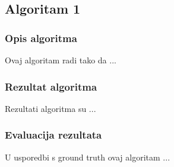 \subsection{Algoritam 1}

\subsubsection{Opis algoritma}
Ovaj algoritam radi tako da ...

\subsubsection{Rezultat algoritma}
Rezultati algoritma su ...

\subsubsection{Evaluacija rezultata}
U usporedbi s ground truth ovaj algoritam ...
